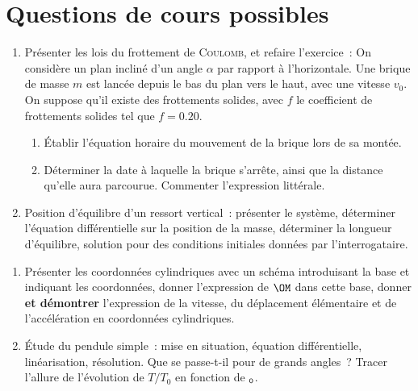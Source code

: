 \documentclass[a4paper, 12pt, final, garamond]{book}
\begin{document}
\newpage
\section{Questions de cours possibles}
\begin{enumerate}
	\item
	      Présenter les lois du frottement de \textsc{Coulomb}, et refaire
	      l'exercice~:
	      \smallbreak
	      On considère un plan incliné d'un angle $\alpha$ par
	      rapport à l'horizontale. Une brique de masse $m$ est
	      lancée depuis le bas du plan vers le haut, avec une vitesse $v_0$.
	      On suppose qu'il existe des frottements solides,
	      avec $f$ le coefficient de frottements solides tel que $f =
		      \num{0.20}$.
	      \begin{enumerate}[label=\sqenumi]
		      \item Établir l'équation horaire du mouvement de la brique lors de
		            sa montée.
		      \item Déterminer la date à laquelle la brique s'arrête, ainsi que la
		            distance qu'elle aura parcourue. Commenter l'expression littérale.
	      \end{enumerate}
	\item
	      Position d'équilibre d'un ressort vertical~: présenter le système,
	      déterminer l'équation différentielle sur la position de la masse,
	      déterminer la longueur d'équilibre, solution pour des conditions
	      initiales données par l'interrogataire.
\end{enumerate}

\begin{enumerate}[resume]
	\item
	      Présenter les coordonnées cylindriques avec un schéma introduisant la
	      base et indiquant les coordonnées, donner l'expression de $\OM$ dans
	      cette base, donner \textbf{et démontrer} l'expression de la vitesse, du
	      déplacement élémentaire et de l'accélération en coordonnées cylindriques.
	\item
	      Étude du pendule simple~: mise en situation, équation différentielle,
	      linéarisation, résolution. Que se passe-t-il pour de grands angles~? Tracer
	      l'allure de l'évolution de $T/T_0$ en fonction de $\tt_0$.
\end{enumerate}
\end{document}
